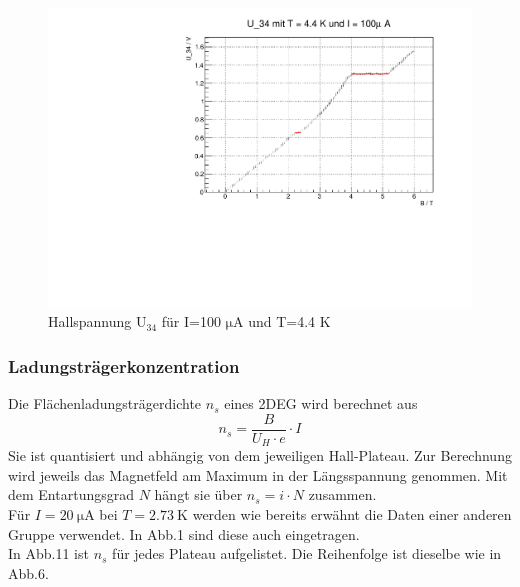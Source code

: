 \begin{figure}
\label{}
\centering
\includegraphics[scale = 0.5]{../plots/U_34_100muA_4400mK.pdf}
\caption{Hallspannung $\mathrm{U_{34}}$ für I=100 $\mathrm{\mu}$A und T=4.4 K}
\end{figure}

\FloatBarrier
\newpage


\subsubsection{Ladungsträgerkonzentration}
Die Flächenladungsträgerdichte $n_s$ eines 2DEG wird berechnet aus
$$n_s = \frac{B}{U_H \cdot e} \cdot I $$
Sie ist quantisiert und abhängig von dem jeweiligen Hall-Plateau. Zur Berechnung wird jeweils das Magnetfeld am Maximum in der Längsspannung genommen. Mit dem Entartungsgrad $N$ hängt sie über $n_s = i \cdot N$ zusammen. \\
Für $I = 20 \ \mathrm{\mu A}$ bei $T = 2.73 \ \mathrm{K}$ werden wie bereits erwähnt die Daten einer anderen Gruppe verwendet. In Abb.1 sind diese auch eingetragen. \\
In Abb.11 ist $n_s$ für jedes Plateau aufgelistet. Die Reihenfolge ist dieselbe wie in Abb.6. \\
